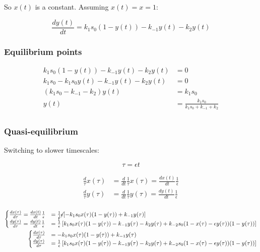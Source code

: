     So $x(t)$ is a constant.
    Assuming $x(t) = x = 1$:

    $$\frac{dy(t)}{dt} = k_1s_0(1-y(t)) - k_{-1}y(t) - k_2y(t)$$

    \subsubsection{Equilibrium points}

    \begin{align*}
      k_1s_0(1-y(t)) - k_{-1}y(t) - k_2y(t) &= 0\\
      k_1s_0 - k_1s_0y(t) - k_{-1}y(t) - k_2y(t) &= 0\\
      (k_1s_0 - k_{-1} - k_2)y(t) &= k_1s_0\\
      y(t) &= \frac{k_1s_0}{k_1s_0 + k_{-1} + k_2}\\
    \end{align*}

    \subsubsection{Quasi-equilibrium}
    Switching to slower timescales:

    $$\tau = \epsilon t$$

    \begin{align*}
      \frac{d}{\tau}x(\tau) &= \frac{d}{dt}\frac{1}{\tau}x(\tau) = \frac{dx(t)}{dt}\frac{1}{\epsilon}\\
      \frac{d}{\tau}y(\tau) &= \frac{d}{dt}\frac{1}{\tau}y(\tau) = \frac{dy(t)}{dt}\frac{1}{\epsilon}\\
    \end{align*}

    \begin{align*}
      \begin{cases}
        \frac{dx(\tau)}{d\tau} = \frac{dx(t)}{dt}\frac{1}{\epsilon} &= \frac{1}{\cancel{\epsilon}}\cancel{\epsilon}[-k_1s_0 x(\tau)(1-y(\tau)) + k_{-1} y(\tau)]\\
        \frac{dy(\tau)}{d\tau} = \frac{dy(t)}{dt}\frac{1}{\epsilon} &= \frac{1}{\epsilon}\left[k_1s_0x(\tau)(1-y(\tau)) - k_{-1}y(\tau) - k_2y(\tau) + k_{-2}s_0(1-x(\tau)-\epsilon y(\tau))(1-y(\tau))\right]\\
      \end{cases}\\
      \begin{cases}
        \frac{dx(\tau)}{d\tau} &= -k_1s_0 x(\tau)(1-y(\tau)) + k_{-1} y(\tau)\\
        \frac{dy(\tau)}{d\tau} &= \frac{1}{\epsilon}\left[k_1s_0x(\tau)(1-y(\tau)) - k_{-1}y(\tau) - k_2y(\tau) + k_{-2}s_0(1-x(\tau)-\epsilon y(\tau))(1-y(\tau))\right]\\
      \end{cases}\\
    \end{align*}

